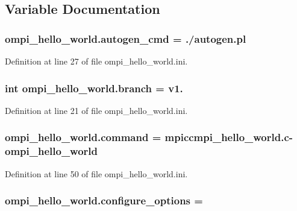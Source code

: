 \subsection{Variable Documentation}
\hypertarget{namespaceompi__hello__world_ab26bf3479d404017c9d0623f42e9dcd3}{
\subsubsection[{autogen\-\_\-cmd}]{\setlength{\rightskip}{0pt plus 5cm}ompi\-\_\-hello\-\_\-world.\-autogen\-\_\-cmd = ./autogen.\-pl}}\label{namespaceompi__hello__world_ab26bf3479d404017c9d0623f42e9dcd3}


Definition at line 27 of file ompi\-\_\-hello\-\_\-world.\-ini.

\hypertarget{namespaceompi__hello__world_a34c1b9feb533b831fb7b0cd036494718}{
\subsubsection[{branch}]{\setlength{\rightskip}{0pt plus 5cm}int ompi\-\_\-hello\-\_\-world.\-branch = v1.}}\label{namespaceompi__hello__world_a34c1b9feb533b831fb7b0cd036494718}


Definition at line 21 of file ompi\-\_\-hello\-\_\-world.\-ini.

\hypertarget{namespaceompi__hello__world_a8e605d382654baee6320ca445c211c82}{
\subsubsection[{command}]{\setlength{\rightskip}{0pt plus 5cm}ompi\-\_\-hello\-\_\-world.\-command = mpiccmpi\-\_\-hello\-\_\-world.\-c-\/ompi\-\_\-hello\-\_\-world}}\label{namespaceompi__hello__world_a8e605d382654baee6320ca445c211c82}


Definition at line 50 of file ompi\-\_\-hello\-\_\-world.\-ini.

\hypertarget{namespaceompi__hello__world_a7b6bd890daea8a06c3daea5019b415f1}{
\subsubsection[{configure\-\_\-options}]{\setlength{\rightskip}{0pt plus 5cm}ompi\-\_\-hello\-\_\-world.\-configure\-\_\-options =}}\label{namespaceompi__hello__world_a7b6bd890daea8a06c3daea5019b415f1}



